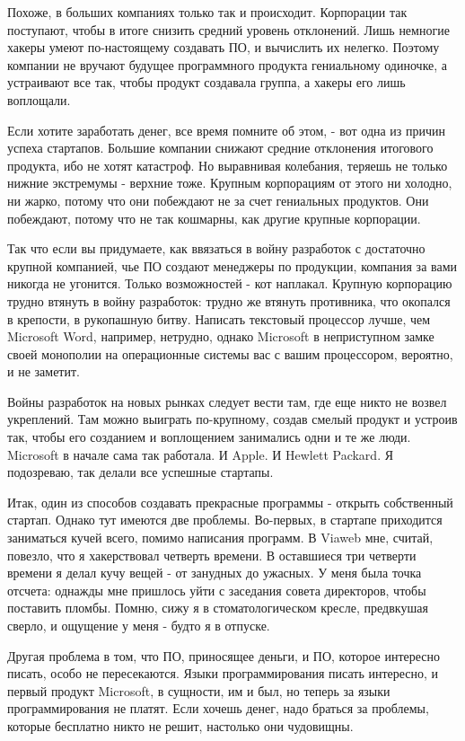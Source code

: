 \documentclass[ebook,12pt,oneside,openany]{memoir}
\begin{document}
Похоже, в больших компаниях только так и происходит. Корпорации так
поступают, чтобы в итоге снизить средний уровень отклонений. Лишь
немногие хакеры умеют по-настоящему создавать ПО, и вычислить их
нелегко. Поэтому компании не вручают будущее программного продукта
гениальному одиночке, а устраивают все так, чтобы продукт создавала
группа, а хакеры его лишь воплощали.

Если хотите заработать денег, все время помните об этом, - вот одна из
причин успеха стартапов. Большие компании снижают средние отклонения
итогового продукта, ибо не хотят катастроф. Но выравнивая колебания,
теряешь не только нижние экстремумы - верхние тоже. Крупным
корпорациям от этого ни холодно, ни жарко, потому что они побеждают не
за счет гениальных продуктов. Они побеждают, потому что не так
кошмарны, как другие крупные корпорации.

Так что если вы придумаете, как ввязаться в войну разработок с
достаточно крупной компанией, чье ПО создают менеджеры по продукции,
компания за вами никогда не угонится. Только возможностей - кот
наплакал. Крупную корпорацию трудно втянуть в войну разработок: трудно
же втянуть противника, что окопался в крепости, в рукопашную битву.
Написать текстовый процессор лучше, чем Microsoft Word, например,
нетрудно, однако Microsoft в неприступном замке своей монополии на
операционные системы вас с вашим процессором, вероятно, и не заметит.

Войны разработок на новых рынках следует вести там, где еще никто не
возвел укреплений. Там можно выиграть по-крупному, создав смелый
продукт и устроив так, чтобы его созданием и воплощением занимались
одни и те же люди. Microsoft в начале сама так работала. И Apple. И
Hewlett Packard. Я подозреваю, так делали все успешные стартапы.

Итак, один из способов создавать прекрасные программы - открыть
собственный стартап. Однако тут имеются две проблемы. Во-первых, в
стартапе приходится заниматься кучей всего, помимо написания программ.
В Viaweb мне, считай, повезло, что я хакерствовал четверть времени. В
оставшиеся три четверти времени я делал кучу вещей - от занудных до
ужасных. У меня была точка отсчета: однажды мне пришлось уйти с
заседания совета директоров, чтобы поставить пломбы. Помню, сижу я в
стоматологическом кресле, предвкушая сверло, и ощущение у меня - будто
я в отпуске.

Другая проблема в том, что ПО, приносящее деньги, и ПО, которое
интересно писать, особо не пересекаются. Языки программирования писать
интересно, и первый продукт Microsoft, в сущности, им и был, но теперь
за языки программирования не платят. Если хочешь денег, надо браться
за проблемы, которые бесплатно никто не решит, настолько они
чудовищны.
\end{document}

